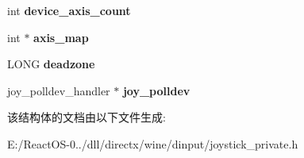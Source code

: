 \begin{DoxyCompactItemize}
\mbox{\label{struct_joystick_generic_impl_a7b002b87953544db9554b66bdd858397}} 
int {\bfseries device\+\_\+axis\+\_\+count}
\item 
\mbox{\label{struct_joystick_generic_impl_a1400524d9c0d4bbd9594dcd935f3b427}} 
int $\ast$ {\bfseries axis\+\_\+map}
\item 
\mbox{\label{struct_joystick_generic_impl_ae322a51d24993811710b3f3e18fbc014}} 
L\+O\+NG {\bfseries deadzone}
\item 
\mbox{\label{struct_joystick_generic_impl_a46884fcf167a1935232164642155ba42}} 
joy\+\_\+polldev\+\_\+handler $\ast$ {\bfseries joy\+\_\+polldev}
\end{DoxyCompactItemize}


该结构体的文档由以下文件生成\+:\begin{DoxyCompactItemize}
\item 
E\+:/\+React\+O\+S-\/0../dll/directx/wine/dinput/joystick\+\_\+private.\+h\end{DoxyCompactItemize}
